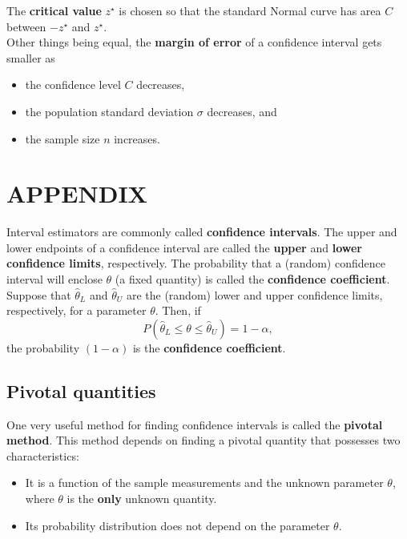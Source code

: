 The \textbf{critical value} $z^\star$ is chosen so that the standard Normal curve has area $C$ between $-z^\star$ and $z^\star$. \\

Other things being equal, the \textbf{margin of error} of a confidence interval gets smaller as
\begin{itemize}
    \item the confidence level $C$ decreases,
    \item the population standard deviation $\sigma$ decreases, and
    \item the sample size $n$ increases.
\end{itemize}
\vspace{\baselineskip} 
\section{APPENDIX}


Interval estimators are commonly called \textbf{confidence intervals}. The upper and lower endpoints of a confidence interval are called the \textbf{upper} and \textbf{lower confidence limits}, respectively. The probability that a (random) confidence interval will enclose $\theta$ (a fixed quantity) is called the \textbf{confidence coefficient}.\\


Suppose that $\hat{\theta}_L$ and $\hat{\theta}_U$ are the (random) lower and upper confidence limits, respectively, for a parameter $\theta$. Then, if
$$P(\hat{\theta}_L \leq \theta \leq \hat{\theta}_U) = 1 - \alpha,$$
the probability $(1 - \alpha)$ is the \textbf{confidence coefficient}.

\subsection*{Pivotal quantities}
One very useful method for finding confidence intervals is called the \textbf{pivotal method}. This method depends on finding a pivotal quantity that possesses two characteristics:
\begin{itemize}
    \item It is a function of the sample measurements and the unknown parameter $\theta$, where $\theta$ is the \textbf{only} unknown quantity.
    \item Its probability distribution does not depend on the parameter $\theta$.
\end{itemize}


